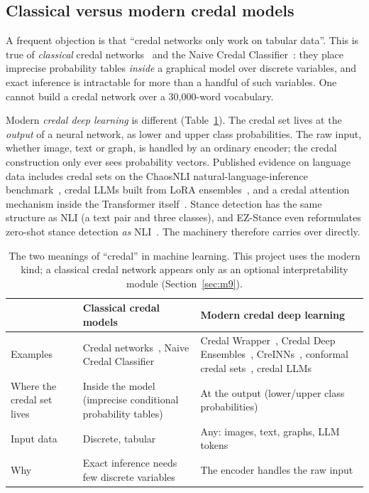 \documentclass[11pt,a4paper]{article}
\begin{document}
\subsection{Classical versus modern credal models}

A frequent objection is that ``credal networks only work on tabular data''. This is true of
\emph{classical} credal networks~\cite{cozman2000} and the Naive Credal
Classifier~\cite{corani2008}: they place imprecise probability tables \emph{inside} a
graphical model over discrete variables, and exact inference is intractable for more than a
handful of such variables. One cannot build a credal network over a 30{,}000-word
vocabulary.

Modern \emph{credal deep learning} is different (Table~\ref{tab:classical}). The credal set
lives at the \emph{output} of a neural network, as lower and upper class probabilities. The
raw input, whether image, text or graph, is handled by an ordinary encoder; the credal
construction only ever sees probability vectors. Published evidence on language data
includes credal sets on the ChaosNLI natural-language-inference
benchmark~\cite{javanmardi2024,hofman2026}, credal LLMs built from LoRA
ensembles~\cite{manchingal2026}, and a credal attention mechanism inside the Transformer
itself~\cite{credaltransformer2025}. Stance detection has the same structure as NLI (a
text pair and three classes), and EZ-Stance even reformulates zero-shot stance detection
\emph{as} NLI~\cite{zhao2024}. The machinery therefore carries over directly.

\begin{table}[t]
\centering
\small
\begin{tabular}{p{3.2cm} p{5.2cm} p{5.6cm}}
\toprule
& Classical credal models & Modern credal deep learning \\
\midrule
Examples & Credal networks~\cite{cozman2000}, Naive Credal Classifier~\cite{corani2008} &
  Credal Wrapper~\cite{wang2025wrapper}, Credal Deep Ensembles~\cite{wang2024crede},
  CreINNs~\cite{wang2025creinn}, conformal credal sets~\cite{javanmardi2024},
  credal LLMs~\cite{manchingal2026} \\
Where the credal set lives & Inside the model (imprecise conditional probability tables) &
  At the output (lower/upper class probabilities) \\
Input data & Discrete, tabular & Any: images, text, graphs, LLM tokens \\
Why & Exact inference needs few discrete variables & The encoder handles the raw input \\
\bottomrule
\end{tabular}
\caption{The two meanings of ``credal'' in machine learning. This project uses the modern
kind; a classical credal network appears only as an optional interpretability module
(Section~\ref{sec:m9}).}
\label{tab:classical}
\end{table}
\end{document}
